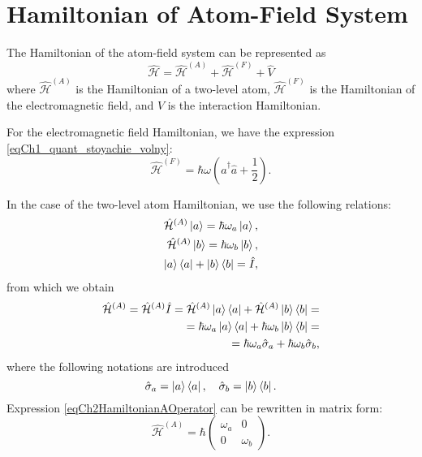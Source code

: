 \section{Hamiltonian of Atom-Field System}
The Hamiltonian of the atom-field system can be represented as
\begin{equation}
\hat{\mathcal{H}} = \hat{\mathcal{H}}^{(A)} +
\hat{\mathcal{H}}^{(F)} + \hat{V}
\nonumber
\end{equation}
where
$\hat{\mathcal{H}}^{(A)}$ is the Hamiltonian of a two-level atom,
$\hat{\mathcal{H}}^{(F)}$ is the Hamiltonian of the electromagnetic field, and
$\hat{V}$ is the interaction Hamiltonian.

For the electromagnetic field Hamiltonian, we have the expression
\eqref{eqCh1_quant_stoyachie_volny}:
\begin{equation}
\hat{\mathcal{H}}^{(F)} = \hbar \omega 
\left(\hat{a}^{\dag}\hat{a} + \frac{1}{2}\right).
\nonumber
\end{equation}

In the case of the two-level atom Hamiltonian, we use the following
relations:
\begin{eqnarray}
\hat{\mathcal{H}}^{(A)}\ket{a} = \hbar \omega_a \ket{a},
\nonumber \\
\hat{\mathcal{H}}^{(A)}\ket{b} = \hbar \omega_b \ket{b},
\nonumber \\
\ket{a}\bra{a} + \ket{b}\bra{b} = \hat{I},
\nonumber
\end{eqnarray}
from which we obtain
\begin{eqnarray}
\hat{\mathcal{H}}^{(A)} = \hat{\mathcal{H}}^{(A)}\hat{I} = 
\hat{\mathcal{H}}^{(A)}
\ket{a}\bra{a} + \hat{\mathcal{H}}^{(A)}
\ket{b}\bra{b} =
\nonumber \\
 = 
\hbar\omega_a
\ket{a}\bra{a} + \hbar\omega_b
\ket{b}\bra{b} =
\nonumber \\
= \hbar \omega_a \hat{\sigma}_a +
\hbar \omega_b \hat{\sigma}_b,
\label{eqCh2HamiltonianAOperator}
\end{eqnarray}
where the following notations are introduced
\begin{equation}
\hat{\sigma}_a = \ket{a}\bra{a},
\quad
\hat{\sigma}_b = \ket{b}\bra{b}.
\nonumber
\end{equation}
Expression \eqref{eqCh2HamiltonianAOperator} can be rewritten in
matrix form:
\begin{equation}
\hat{\mathcal{H}}^{(A)} = \hbar 
\left(
\begin{array} {cc}
\omega_a & 0  
\\
0 & \omega_b 
\end{array}
\right).
\label{eqCh2HamiltonianA}
\end{equation}

